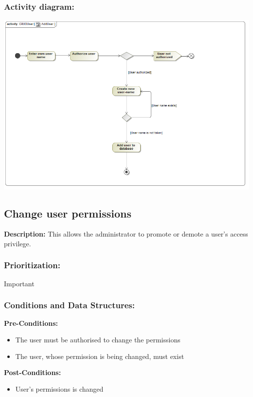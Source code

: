 \subsubsection{Activity diagram:}
\includegraphics[width=1\linewidth]{./Graphics/AddUser.png}

\subsection{Change user permissions}
\textbf{Description:}
This allows the administrator to promote or demote a user's access privilege.
\subsubsection{Prioritization:}
Important
\subsubsection{Conditions and Data Structures:}
\textbf{Pre-Conditions:}
	\begin{itemize}
	\item The user must be authorised to change the permissions
	\item The user, whose permission is being changed, must exist
	\end{itemize}
\textbf{Post-Conditions:}
	\begin{itemize}
	\item User's permissions is changed
	\end{itemize}	
